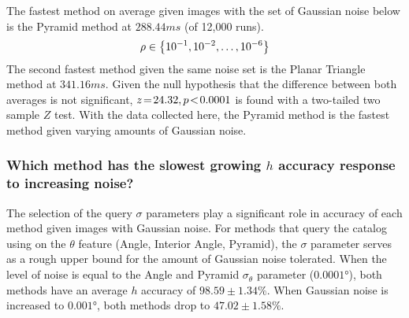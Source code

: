 %
%
%
%
The fastest method on average given images with the set of Gaussian noise below is the Pyramid method at
$288.44\si{ms}$ (of 12,000 runs).
\begin{equation}\label{eq:sigmasTested}
    \rho \in \set{10^{-1}, 10^{-2}, \ldots, 10^{-6}}
\end{equation}
The second fastest method given the same noise set is the Planar Triangle method at $341.16\si{ms}$.
Given the null hypothesis that the difference between both averages is not significant, $z \!=\! 24.32, p\!<\!0.0001$ is
found with a two-tailed two sample $Z$ test.
With the data collected here, the Pyramid method is the fastest method given varying amounts of Gaussian noise.

\subsubsection{Which method has the slowest growing $h$ accuracy response to increasing noise?}
The selection of the query $\sigma$ parameters play a significant role in accuracy of each method given images with
Gaussian noise.
For methods that query the catalog using on the $\theta$ feature (Angle, Interior Angle, Pyramid), the $\sigma$
parameter serves as a rough upper bound for the amount of Gaussian noise tolerated.
When the level of noise is equal to the Angle and Pyramid $\sigma_\theta$ parameter ($\ang{0.0001}$),
both methods have an average $h$ accuracy of $98.59\!\pm\!1.34\%$.
When Gaussian noise is increased to $\ang{0.001}$, both methods drop to $47.02\!\pm\!1.58\%$.

